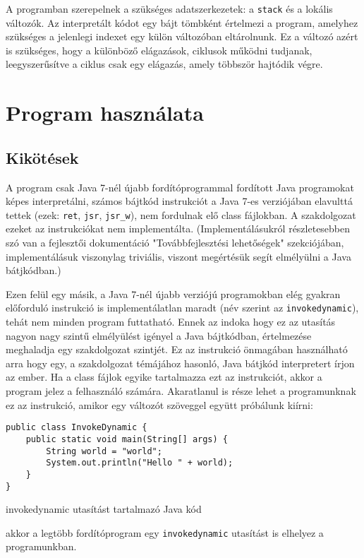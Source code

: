 A programban szerepelnek a szükséges adatszerkezetek: a \lstinline{stack} és a lokális változók. Az interpretált kódot egy bájt tömbként értelmezi a program, amelyhez szükséges a jelenlegi indexet egy külön változóban eltárolnunk. Ez a változó azért is szükséges, hogy a különböző elágazások, ciklusok működni tudjanak, leegyszerűsítve a ciklus csak egy elágazás, amely többször hajtódik végre.

\section{Program használata}

\subsection{Kikötések}
A program csak Java 7-nél újabb fordítóprogrammal fordított Java programokat képes interpretálni, számos bájtkód instrukciót a Java 7-es verziójában elavulttá tettek (ezek: \lstinline{ret}, \lstinline{jsr}, \lstinline{jsr_w}), nem fordulnak elő class fájlokban. A szakdolgozat ezeket az instrukciókat nem implementálta. (Implementálásukról részletesebben szó van a fejlesztői dokumentáció "Továbbfejlesztési lehetőségek" szekciójában, implementálásuk viszonylag triviális, viszont megértésük segít elmélyülni a Java bátjkódban.)

Ezen felül egy másik, a Java 7-nél újabb verziójú programokban elég gyakran előforduló instrukció is implementálatlan maradt (név szerint az \lstinline{invokedynamic}), tehát nem minden program futtatható. Ennek az indoka hogy ez az utasítás nagyon nagy szintű elmélyülést igényel a Java bájtkódban, értelmezése meghaladja egy szakdolgozat szintjét. Ez az instrukció önmagában használható arra hogy egy, a szakdolgozat témájához hasonló, Java bátjkód interpretert írjon az ember. Ha a class fájlok egyike tartalmazza ezt az instrukciót, akkor a program jelez a felhasználó számára. Akaratlanul is része lehet a programunknak ez az instrukció, amikor egy változót szöveggel együtt próbálunk kiírni:
\begin{listing}[H]
\begin{verbatim}
public class InvokeDynamic {
	public static void main(String[] args) {
		String world = "world";
		System.out.println("Hello " + world);
	}
}
\end{verbatim}
\caption{invokedynamic utasítást tartalmazó Java kód}
\end{listing}
akkor a legtöbb fordítóprogram egy \lstinline{invokedynamic} utasítást is elhelyez a programunkban.

